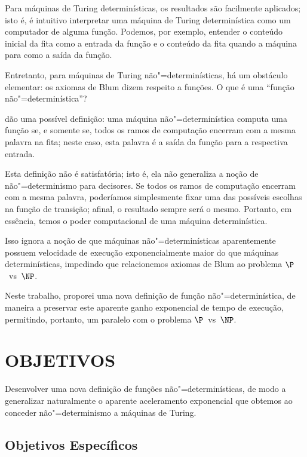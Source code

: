 Para máquinas de Turing determinísticas,
os resultados são facilmente aplicados;
isto é,
é intuitivo interpretar uma máquina de Turing determinística
como um computador de alguma função.
Podemos, por exemplo,
entender o conteúdo inicial da fita como a entrada da função
e o conteúdo da fita quando a máquina para como a saída da função.

Entretanto, para máquinas de Turing não"=determinísticas,
há um obstáculo elementar:
os axiomas de Blum dizem respeito a funções.
O que é uma ``função não"=determinística''?

 dão uma possível definição:
uma máquina não"=determinística computa uma função se,
e somente se,
todos os ramos de computação encerram com a mesma palavra na fita;
neste caso,
esta palavra é a saída da função para a respectiva entrada.

Esta definição não é satisfatória;
isto é, ela não generaliza a noção de não"=determinismo para decisores.
Se todos os ramos de computação encerram com a mesma palavra,
poderíamos simplesmente fixar uma das possíveis escolhas na função de transição;
afinal, o resultado sempre será o mesmo.
Portanto, em essência,
temos o poder computacional de uma máquina determinística.

Isso ignora a noção de que máquinas não"=determinísticas
aparentemente possuem velocidade de execução exponencialmente maior
do que máquinas determinísticas,
impedindo que relacionemos axiomas de Blum
ao problema $\P$~vs~$\NP$.

Neste trabalho,
proporei uma nova definição de função não"=determinística,
de maneira a preservar este aparente ganho exponencial de tempo de execução,
permitindo, portanto,
um paralelo com o problema $\P$~vs~$\NP$.

\section{OBJETIVOS}

Desenvolver uma nova definição de funções não"=determinísticas,
de modo a generalizar naturalmente o aparente aceleramento exponencial
que obtemos ao conceder não"=determinismo a máquinas de Turing.

\subsection[Objetivos específicos]{Objetivos Específicos\footnotemark}

